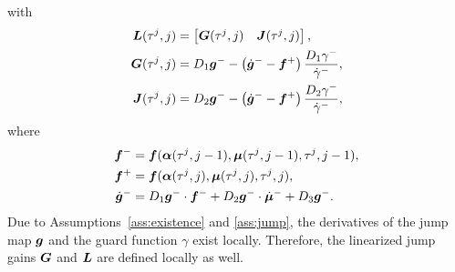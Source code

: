 \documentclass[../DC2017114Bouma.tex]{subfiles}
\begin{document}
with 
\begin{align}
{\boldsymbol{L}}(\tau^j,j) &= \begin{bmatrix}
{\boldsymbol{G}}(\tau^j,j) & {\boldsymbol{J}}(\tau^j,j)
\end{bmatrix},\\
{\boldsymbol{G}}(\tau^j,j) & = D_1{\boldsymbol{g}}^- - \left(\dot{{\boldsymbol{g}}}^- - {\boldsymbol{f}}^+\right)\frac{D_1\gamma^-}{\dot{\gamma}^-},\\
{\boldsymbol{J}}(\tau^j,j) & = D_2{\boldsymbol{g}}^- - \left(\dot{{\boldsymbol{g}}}^- - {\boldsymbol{f}}^+\right)\frac{D_2\gamma^-}{\dot{\gamma}^-},
\end{align}
where
\begin{align}
{\boldsymbol{f}}^- &= {\boldsymbol{f}}(\boldsymbol{\alpha}(\tau^j,j-1),\boldsymbol{\mu}(\tau^j,j-1),\tau^j,j-1),\\
{\boldsymbol{f}}^+ &= {\boldsymbol{f}}(\boldsymbol{\alpha}(\tau^j,j),\boldsymbol{\mu}(\tau^j,j),\tau^j,j),\\
\dot{{\boldsymbol{g}}}^- &= D_1{\boldsymbol{g}}^-\cdot {\boldsymbol{f}}^- + D_2{\boldsymbol{g}}^-\cdot \dot{\boldsymbol{\mu}}^- + D_3{\boldsymbol{g}}^-.
\end{align}
Due to Assumptions~\ref{ass:existence} and \ref{ass:jump}, the derivatives of the jump map ${\boldsymbol{g}}$ and the guard function $\gamma$ exist locally. Therefore, the linearized jump gains ${\boldsymbol{G}}$ and ${\boldsymbol{L}}$ are defined locally as well.
\end{document}
